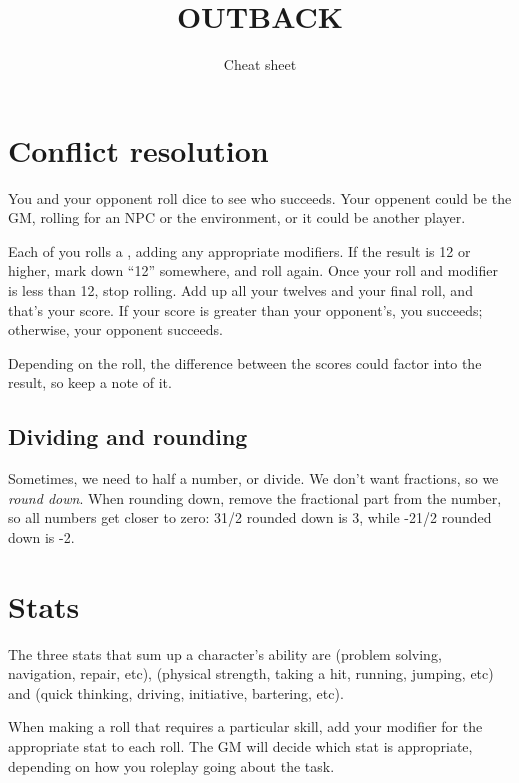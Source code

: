 \documentclass[10pt, a4paper, twocolumn]{article}
\title{\uppercase{Outback}}
\subtitle{Cheat sheet}
\date{}
\begin{document}
\maketitle

\section{Conflict resolution}
You and your opponent roll dice to see who succeeds. Your oppenent could be the
GM, rolling for an NPC or the environment, or it could be another player.

Each of you rolls a , adding any appropriate modifiers. If the result
is 12 or higher, mark down ``12'' somewhere, and roll again. Once your roll and
modifier is less than 12, stop rolling. Add up all your twelves and your final
roll, and that's your score. If your score is greater than your opponent's, you
succeeds; otherwise, your opponent succeeds.

Depending on the roll, the difference between the scores could factor into the
result, so keep a note of it. 

\subsection{Dividing and rounding}
Sometimes, we need to half a number, or divide. We don't want fractions, so we
\emph{round down}. When rounding down, remove the fractional part from the
number, so all numbers get closer to zero: 3{1/2} rounded down is 3, while -2{1/2}
rounded down is -2.

\section{Stats}
The three stats that sum up a character's ability are  (problem
solving, navigation, repair,  etc),  (physical strength, taking a
hit, running, jumping, etc) and  (quick thinking, driving,
initiative, bartering, etc).

When making a roll that requires a particular skill, add your modifier for the
appropriate stat to each roll. The GM will decide which stat is appropriate,
depending on how you roleplay going about the task.
\end{document}
